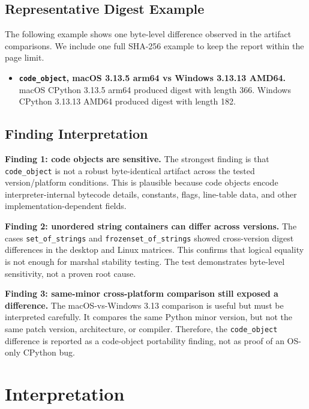 \documentclass[10pt,a4paper]{article}
\begin{document}
\subsection{Representative Digest Example}

The following example shows one byte-level difference observed in the artifact comparisons. We include one full SHA-256 example to keep the report within the page limit.

\begin{itemize}
    \item \textbf{\texttt{code\_object}, macOS 3.13.5 arm64 vs Windows 3.13.13 AMD64.}
    macOS CPython 3.13.5 arm64 produced digest
    with length 366. Windows CPython 3.13.13 AMD64 produced digest
    with length 182.
\end{itemize}

\subsection{Finding Interpretation}

\textbf{Finding 1: code objects are sensitive.}
The strongest finding is that \texttt{code\_object} is not a robust byte-identical artifact across the tested version/platform conditions. This is plausible because code objects encode interpreter-internal bytecode details, constants, flags, line-table data, and other implementation-dependent fields.

\textbf{Finding 2: unordered string containers can differ across versions.}
The cases \texttt{set\_of\_strings} and \texttt{frozenset\_of\_strings} showed cross-version digest differences in the desktop and Linux matrices. This confirms that logical equality is not enough for marshal stability testing. The test demonstrates byte-level sensitivity, not a proven root cause.

\textbf{Finding 3: same-minor cross-platform comparison still exposed a difference.}
The macOS-vs-Windows 3.13 comparison is useful but must be interpreted carefully. It compares the same Python minor version, but not the same patch version, architecture, or compiler. Therefore, the \texttt{code\_object} difference is reported as a code-object portability finding, not as proof of an OS-only CPython bug.

\section{Interpretation}
\end{document}
